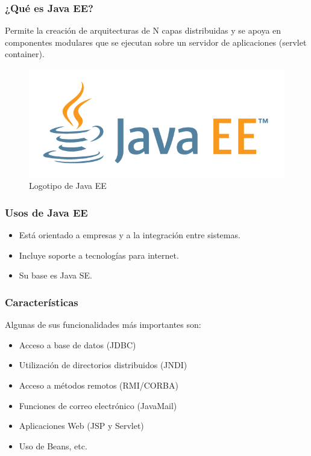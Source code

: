 \documentclass{beamer}
\begin{document}
\begin{frame}
  \frametitle{¿Qué es Java EE?}
  Permite la creación de arquitecturas de N capas distribuidas y se
  apoya en componentes modulares que se ejecutan sobre un servidor de
  aplicaciones (servlet container).

  \begin{figure}[ht]
    \centering
    \includegraphics[scale=0.25]{figures/javaee1.png}
    \caption{\label{fig:javaee1}Logotipo de Java EE}
  \end{figure}
\end{frame}

\begin{frame}
  \frametitle{Usos de Java EE}

  \begin{itemize}
    \item Está orientado a empresas y a la integración entre sistemas.
    \item Incluye soporte a tecnologías para internet.
    \item Su base es Java SE.\@
  \end{itemize}
\end{frame}

\begin{frame}
  \frametitle{Características}
    Algunas de sus funcionalidades más importantes son:
  \begin{itemize}
    \item Acceso a base de datos (JDBC)
    \item Utilización de directorios distribuidos (JNDI)
    \item Acceso a métodos remotos (RMI/CORBA)
    \item Funciones de correo electrónico (JavaMail)
    \item Aplicaciones Web (JSP y Servlet)
    \item Uso de Beans, etc.
  \end{itemize}
\end{frame}
\end{document}
